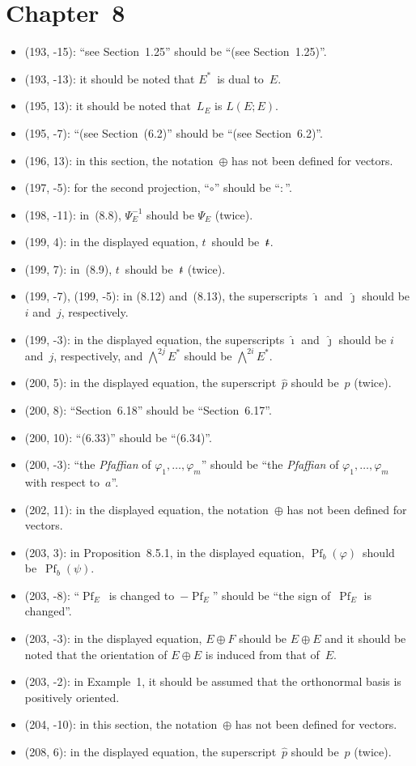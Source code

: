 \documentclass[letterpaper,12pt]{article}
\DeclareMathOperator{\Pf}{Pf}
\newcommand{\after}{\circ}
\newcommand{\dsum}{\oplus}
\newcommand{\bigeprod}{\bigwedge}
\newcommand{\stroked}[1]{\mathrlap{\text{\kern0.05em-}}#1}
\newcommand{\unit}{\stroked{t}}
\begin{document}
\section*{Chapter~8}
\begin{itemize}
\item (193, -15): ``see Section~1.25'' should be ``(see Section~1.25)''.
\item (193, -13): it should be noted that \(E^*\)~is dual to~\(E\).
\item (195, 13): it should be noted that~\(L_E\) is \(L(E;E)\).
\item (195, -7): ``(see Section~(6.2)'' should be ``(see Section~6.2)''.
\item (196, 13): in this section, the notation~\(\dsum\) has not been defined for vectors.
\item (197, -5): for the second projection, ``\(\after\)'' should be ``\(:\)''.
\item (198, -11): in~(8.8), \(\Psi_E^{-1}\) should be \(\Psi_E\) (twice).
\item (199, 4): in the displayed equation, \(t\)~should be~\(\unit\).
\item (199, 7): in~(8.9), \(t\)~should be~\(\unit\) (twice).
\item (199, -7), (199, -5): in (8.12) and~(8.13), the superscripts \(\hat{\imath}\) and~\(\hat{\jmath}\) should be \(i\) and~\(j\), respectively.
\item (199, -3): in the displayed equation, the superscripts \(\hat{\imath}\) and~\(\hat{\jmath}\) should be \(i\) and~\(j\), respectively, and \(\bigeprod^{2j}E^*\) should be \(\bigeprod^{2i}E^*\).
\item (200, 5): in the displayed equation, the superscript~\(\hat{p}\) should be~\(p\) (twice).
\item (200, 8): ``Section~6.18'' should be ``Section~6.17''.
\item (200, 10): ``(6.33)'' should be ``(6.34)''.
\item (200, -3): ``the \emph{Pfaffian} of \(\varphi_1,\ldots,\varphi_m\)'' should be ``the \emph{Pfaffian} of \(\varphi_1,\ldots,\varphi_m\) with respect to~\(a\)''.
\item (202, 11): in the displayed equation, the notation~\(\dsum\) has not been defined for vectors.
\item (203, 3): in Proposition~8.5.1, in the displayed equation, \(\Pf_b(\varphi)\)~should be~\(\Pf_b(\psi)\).
\item (203, -8): ``\(\Pf_E\)~is changed to~\(-\Pf_E\)'' should be ``the sign of~\(\Pf_E\) is changed''.
\item (203, -3): in the displayed equation, \(E\dsum F\) should be \(E\dsum E\) and it should be noted that the orientation of \(E\dsum E\) is induced from that of~\(E\).
\item (203, -2): in Example~1, it should be assumed that the orthonormal basis is positively oriented.
\item (204, -10): in this section, the notation~\(\dsum\) has not been defined for vectors.
\item (208, 6): in the displayed equation, the superscript~\(\hat{p}\) should be~\(p\) (twice).
\end{itemize}
\end{document}
